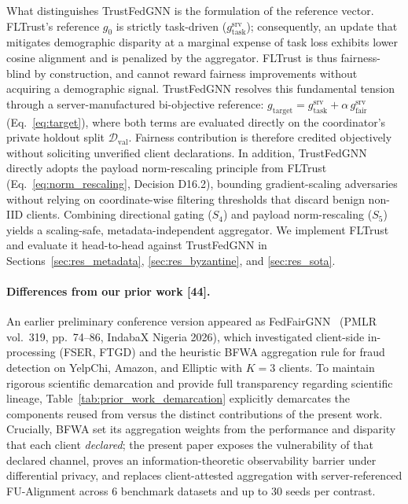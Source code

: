\documentclass[preprint,12pt]{elsarticle}
\theoremstyle{plain}
\theoremstyle{definition}
\theoremstyle{remark}
\begin{document}
What distinguishes TrustFedGNN is the formulation of the reference vector. FLTrust's reference $g_0$ is strictly task-driven ($g_{\mathrm{task}}^{\mathrm{srv}}$); consequently, an update that mitigates demographic disparity at a marginal expense of task loss exhibits lower cosine alignment and is penalized by the aggregator. FLTrust is thus fairness-blind by construction, and cannot reward fairness improvements without acquiring a demographic signal. TrustFedGNN resolves this fundamental tension through a server-manufactured bi-objective reference: $g_{\mathrm{target}} = g_{\mathrm{task}}^{\mathrm{srv}} + \alpha\, g_{\mathrm{fair}}^{\mathrm{srv}}$ (Eq.~\ref{eq:target}), where both terms are evaluated directly on the coordinator's private holdout split $\mathcal{D}_{\mathrm{val}}$. Fairness contribution is therefore credited objectively without soliciting unverified client declarations. In addition, TrustFedGNN directly adopts the payload norm-rescaling principle from FLTrust (Eq.~\ref{eq:norm_rescaling}, Decision D16.2), bounding gradient-scaling adversaries without relying on coordinate-wise filtering thresholds that discard benign non-IID clients. Combining directional gating ($S_4$) and payload norm-rescaling ($S_5$) yields a scaling-safe, metadata-independent aggregator. We implement FLTrust and evaluate it head-to-head against TrustFedGNN in Sections~\ref{sec:res_metadata}, \ref{sec:res_byzantine}, and \ref{sec:res_sota}.

\paragraph{Differences from our prior work [44].}
An earlier preliminary conference version appeared as FedFairGNN~\cite{dang2026fedfairgnn} (PMLR vol.~319, pp.~74--86, IndabaX Nigeria 2026), which investigated client-side in-processing (FSER, FTGD) and the heuristic BFWA aggregation rule for fraud detection on YelpChi, Amazon, and Elliptic with $K=3$ clients. To maintain rigorous scientific demarcation and provide full transparency regarding scientific lineage, Table~\ref{tab:prior_work_demarcation} explicitly demarcates the components reused from \cite{dang2026fedfairgnn} versus the distinct contributions of the present work. Crucially, BFWA set its aggregation weights from the performance and disparity that each client \emph{declared}; the present paper exposes the vulnerability of that declared channel, proves an information-theoretic observability barrier under differential privacy, and replaces client-attested aggregation with server-referenced FU-Alignment across 6 benchmark datasets and up to 30 seeds per contrast.
\end{document}
